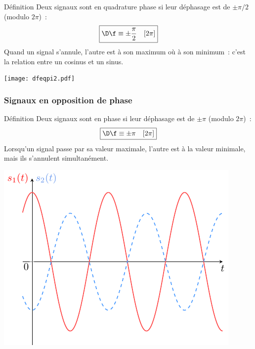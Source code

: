 \documentclass[../main/main.tex]{subfiles}
\begin{document}
\begin{minipage}{0.70\linewidth}
    \begin{rdefi}{\small Définition}
        Deux signaux sont en quadrature phase si leur déphasage est de
        $\pm\pi/2$ (modulo $2\pi$)~:
        \[\boxed{\D\f \equiv \pm\frac{\pi}{2} \quad[2\pi]}\]
        Quand un signal s'annule, l'autre est à son maximum où à son minimum~:
        c'est la relation entre un cosinus et un sinus.
    \end{rdefi}
\end{minipage}
\hfill
\begin{minipage}{0.30\linewidth}
    \begin{center}
        \texttt{[image: dfeqpi2.pdf]}
    \end{center}
\end{minipage}

\newpage
\subsubsection{Signaux en opposition de phase}

\begin{minipage}{0.70\linewidth}
    \begin{rdefi}{\small Définition}
        Deux signaux sont en phase si leur déphasage est de $\pm\pi$ (modulo $2\pi$)~:
        \[\boxed{\D\f \equiv \pm\pi \quad[2\pi]}\]
        Lorsqu'un signal passe par sa valeur maximale, l'autre est à la valeur
        minimale, mais ils s'annulent simultanément.
    \end{rdefi}
\end{minipage}
\hfill
\begin{minipage}{0.30\linewidth}
    \begin{center}
        \includegraphics[width=\linewidth]{dfeqpi.pdf}
    \end{center}
\end{minipage}
\end{document}
